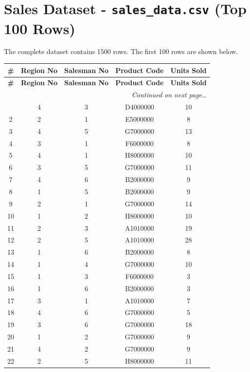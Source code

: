 \documentclass[12pt,a4paper]{article}
\begin{document}
\newpage
\section{Sales Dataset - \texttt{sales\_data.csv} (Top 100 Rows)}

The complete dataset contains 1500 rows. The first 100 rows are shown below.

\begin{center}
\small
\begin{longtable}{c c c c c}
\toprule
\textbf{\#} & \textbf{Region No} & \textbf{Salesman No} & \textbf{Product Code} & \textbf{Units Sold} \\
\midrule
\endfirsthead
\toprule
\textbf{\#} & \textbf{Region No} & \textbf{Salesman No} & \textbf{Product Code} & \textbf{Units Sold} \\
\midrule
\endhead
\midrule
\multicolumn{5}{r}{\textit{Continued on next page\ldots}} \\
\endfoot
\bottomrule
\endlastfoot
1 & 4 & 3 & D4000000 & 10 \\
2 & 2 & 1 & E5000000 & 8 \\
3 & 4 & 5 & G7000000 & 13 \\
4 & 3 & 1 & F6000000 & 8 \\
5 & 4 & 1 & H8000000 & 10 \\
6 & 3 & 5 & G7000000 & 11 \\
7 & 4 & 6 & B2000000 & 9 \\
8 & 1 & 5 & B2000000 & 9 \\
9 & 2 & 1 & G7000000 & 14 \\
10 & 1 & 2 & H8000000 & 10 \\
11 & 2 & 3 & A1010000 & 19 \\
12 & 2 & 5 & A1010000 & 28 \\
13 & 1 & 6 & B2000000 & 8 \\
14 & 1 & 4 & G7000000 & 10 \\
15 & 1 & 3 & F6000000 & 3 \\
16 & 1 & 6 & B2000000 & 3 \\
17 & 3 & 1 & A1010000 & 7 \\
18 & 4 & 6 & G7000000 & 5 \\
19 & 3 & 6 & G7000000 & 18 \\
20 & 1 & 2 & G7000000 & 9 \\
21 & 4 & 2 & G7000000 & 9 \\
22 & 2 & 5 & H8000000 & 11 \\

\end{longtable}
\end{center}
\end{document}

